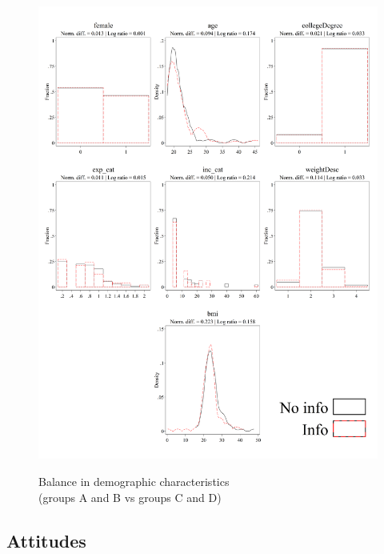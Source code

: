 \documentclass[12pt]{article}
\begin{document}
\begin{figure}[ht]
  \caption{Balance in demographic characteristics \\ (groups A and B vs groups C and D)}\label{fig:group1_demographics}
  \begin{center}
  {\includegraphics[width=1\textwidth]{./figures/covDifExp_demographics.png}}
  \end{center}
\end{figure}

\FloatBarrier

\clearpage

\subsection{Attitudes}
\end{document}

